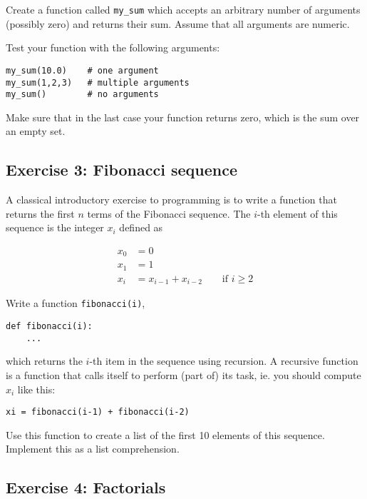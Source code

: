 \documentclass[10pt]{scrartcl}
\begin{document}
Create a function called \texttt{my\_sum} which accepts an arbitrary
number of arguments (possibly zero) and returns their sum. Assume that
all arguments are numeric.

Test your function with the following arguments:

\begin{verbatim}
my_sum(10.0)    # one argument
my_sum(1,2,3)   # multiple arguments
my_sum()        # no arguments
\end{verbatim}

Make sure that in the last case your function returns zero, which is the
sum over an empty set.

\hypertarget{exercise-3-fibonacci-sequence}{%
\subsection{Exercise 3: Fibonacci
sequence}\label{exercise-3-fibonacci-sequence}}

A classical introductory exercise to programming is to write a function
that returns the first \(n\) terms of the Fibonacci sequence. The
\(i\)-th element of this sequence is the integer \(x_i\) defined as

\begin{align} x_0&=0   \\
x_1 &= 1  \\
x_i &= x_{i-1} + x_{i-2} \qquad \text{if } i \geq 2
\end{align}

Write a function \texttt{fibonacci(i)},

\begin{verbatim}
def fibonacci(i):
    ...
\end{verbatim}

which returns the \(i\)-th item in the sequence using recursion. A
recursive function is a function that calls itself to perform (part of)
its task, ie. you should compute \(x_i\) like this:

\begin{verbatim}
xi = fibonacci(i-1) + fibonacci(i-2)
\end{verbatim}

Use this function to create a list of the first 10 elements of this
sequence. Implement this as a list comprehension.

\hypertarget{exercise-4-factorials}{%
\subsection{Exercise 4: Factorials}\label{exercise-4-factorials}}
\end{document}
